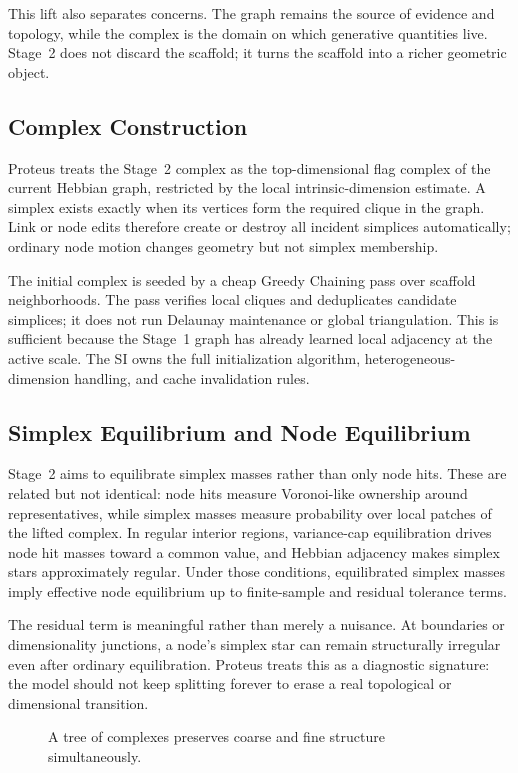 \documentclass[11pt]{article}
\theoremstyle{definition}
\theoremstyle{plain}
\begin{document}
This lift also separates concerns. The graph remains the source of evidence and topology, while the complex is the domain on which generative quantities live. Stage~2 does not discard the scaffold; it turns the scaffold into a richer geometric object.

\subsection{Complex Construction}
Proteus treats the Stage~2 complex as the top-dimensional flag complex of the current Hebbian graph, restricted by the local intrinsic-dimension estimate. A simplex exists exactly when its vertices form the required clique in the graph. Link or node edits therefore create or destroy all incident simplices automatically; ordinary node motion changes geometry but not simplex membership.

The initial complex is seeded by a cheap Greedy Chaining pass over scaffold neighborhoods. The pass verifies local cliques and deduplicates candidate simplices; it does not run Delaunay maintenance or global triangulation. This is sufficient because the Stage~1 graph has already learned local adjacency at the active scale. The SI owns the full initialization algorithm, heterogeneous-dimension handling, and cache invalidation rules.

\subsection{Simplex Equilibrium and Node Equilibrium}
Stage~2 aims to equilibrate simplex masses rather than only node hits. These are related but not identical: node hits measure Voronoi-like ownership around representatives, while simplex masses measure probability over local patches of the lifted complex. In regular interior regions, variance-cap equilibration drives node hit masses toward a common value, and Hebbian adjacency makes simplex stars approximately regular. Under those conditions, equilibrated simplex masses imply effective node equilibrium up to finite-sample and residual tolerance terms.

The residual term is meaningful rather than merely a nuisance. At boundaries or dimensionality junctions, a node's simplex star can remain structurally irregular even after ordinary equilibration. Proteus treats this as a diagnostic signature: the model should not keep splitting forever to erase a real topological or dimensional transition.

\begin{figure}[t]
    \centering
    \caption{A tree of complexes preserves coarse and fine structure simultaneously.}
    \label{fig:hierarchy-comparison}
\end{figure}
\end{document}
